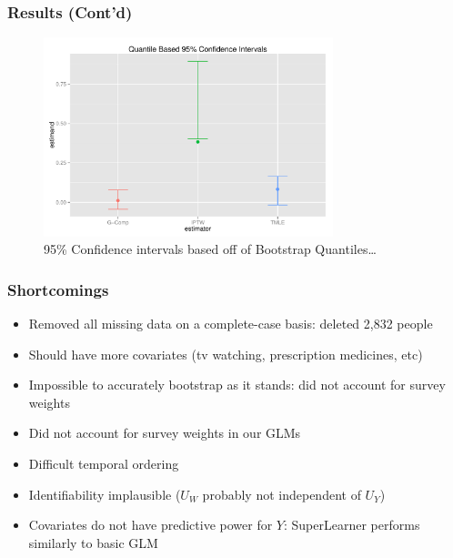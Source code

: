 \documentclass{beamer}
\begin{document}
\begin{frame}
\frametitle{Results (Cont'd)}
\begin{figure}[ht!]
\centering
\includegraphics[width=0.75\textwidth]{bootstrap-quantile-ci.pdf}
\caption{95\% Confidence intervals based off of Bootstrap Quantiles\ldots}
\end{figure}
\end{frame}

\begin{frame}
\frametitle{Shortcomings}
  \begin{itemize}
    \vfill\item Removed all missing data on a complete-case basis: deleted 2,832 people
    \vfill\item Should have more covariates (tv watching, prescription medicines, etc)
    \vfill\item Impossible to accurately bootstrap as it stands: did not account for survey weights
    \vfill\item Did not account for survey weights in our GLMs
    \vfill\item Difficult temporal ordering
    \vfill\item Identifiability implausible ($U_W$ probably not independent of $U_Y$)
    \vfill\item Covariates do not have predictive power for $Y$: SuperLearner performs similarly to basic GLM
  \end{itemize}
  \vfill
\end{frame}
\end{document}
